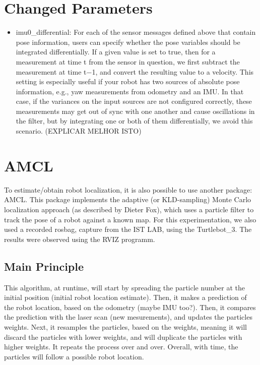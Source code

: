 \section{Changed Parameters} 
\begin{itemize}
    \item imu0\_differential: For each of the sensor messages defined above that contain pose information, users can specify whether the pose variables should be integrated differentially. If a given value is set to true, then for a measurement at time t from the sensor in question, we first subtract the measurement at time t−1, and convert the resulting value to a velocity. This setting is especially useful if your robot has two sources of absolute pose information, e.g., yaw measurements from odometry and an IMU. In that case, if the variances on the input sources are not configured correctly, these measurements may get out of sync with one another and cause oscillations in the filter, but by integrating one or both of them differentially, we avoid this scenario. (EXPLICAR MELHOR ISTO)
\end{itemize}

\section{AMCL}
To estimate/obtain robot localization, it is also possible to use another package: AMCL. This package implements the adaptive (or KLD-sampling) Monte Carlo localization approach (as described by Dieter Fox), which uses a particle filter to track the pose of a robot against a known map. For this experimentation, we also used a recorded rosbag, capture from the IST LAB, using the Turtlebot\_3. The results were observed using the RVIZ programm.

\subsection{Main Principle}
This algorithm, at runtime, will start by spreading the particle number at the initial position (initial robot location estimate). Then, it makes a prediction of the robot location, based on the odometry (maybe IMU too?). Then, it compares the prediction with the laser scan (new mesurements), and updates the particles weights. Next, it resamples the particles, based on the weights, meaning it will discard the particles with lower weights, and will duplicate the particles with higher weights. It repeats the process over and over. 
Overall, with time, the particles will follow a possible robot location.

